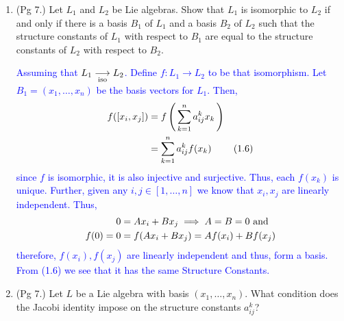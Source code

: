 \documentclass[12pt,a4paper]{report}
\newcommand{\BLUE}[1]{\textcolor{blue}{#1}}
\newcommand{\LB}[2]{\left [ #1,#2 \right ]}
\begin{document}
\begin{enumerate}[label=\textit{1.\arabic*}]
\begin{enumerate}[label=(\roman*)]
\end{enumerate}

\item (Pg 7.)  Let $L_1$ and $L_2$ be Lie algebras.  Show that $L_1$ is isomorphic to $L_2$ if and only if there is a basis $B_1$ of $L_1$ and a basis $B_2$ of $L_2$ such that the structure constants of $L_1$ with respect to $B_1$ are equal to the structure constants of $L_2$ with respect to $B_2$.

\BLUE{\IF Assuming that $L_1 \underset{\text{iso}}\longrightarrow L_2$.  Define $f:L_1 \to L_2$ to be that isomorphism. Let $B_1=(x_1,\dots,x_n)$ be the basis vectors for $L_1$.  Then, 
\begin{align*}
	f(\LB{x_i}{x_j}) 
	&= f\PAREN{\sum_{k=1}^na_{ij}^k x_k} \\
	&= \sum_{k=1}^na_{ij}^k f(x_k) & (1.6)
\end{align*}since $f$ is isomorphic, it is also injective and surjective.  Thus, each $f(x_k)$ is unique.  Further, given any $i,j \in [1,\dots,n]$ we know that $x_i,x_j$ are linearly independent.  Thus, 
\begin{align*}
	0&= Ax_i+Bx_j \implies A=B=0 \text{ and } \\
	f(0) = 0 &= f(Ax_i+Bx_j)= Af(x_i)+Bf(x_j)
\end{align*}therefore, $f(x_i), f(x_j)$ are linearly independent and thus, form a basis.  From (1.6) we see that it has the same Structure Constants.
}

\item (Pg 7.)  Let $L$ be a Lie algebra with basis $(x_1, \dots, x_n)$.  What condition does the Jacobi identity impose on the structure constants $a_{ij}^k$?


\end{enumerate}
\end{document}
